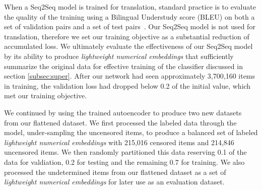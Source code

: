 When a Seq2Seq model is trained for translation, standard practice is to evaluate the quality of the training using a Bilingual Understudy score (BLEU) on both a set of validation pairs and a set of test pairs~\cite{papineni_bleu_2001}. Our Seq2Seq model is not used for translation, therefore we set our training objective as a substantial reduction of accumulated loss. We ultimately evaluate the effectiveness of our Seq2Seq model by its ability to produce \textit{lightweight numerical embeddings} that sufficiently summarize the original data for effective training of the classifier discussed in section \ref{subsec:super}. After our network had seen approximately 3,700,160 items in training, the validation loss had dropped below 0.2 of the initial value, which met our training objective.

We continued by using the trained autoencoder to produce two new datasets from our flattened dataset. We first processed the labeled data through the model, under-sampling the uncensored items, to produce a balanced set of labeled \textit{lightweight numerical embeddings} with 215,016 censored items and 214,846 uncensored items.  We then randomly partitioned this data reserving 0.1 of the data for valdiation, 0.2 for testing and the remaining 0.7 for training. We also processed the undetermined items from our flattened dataset as a set of \textit{lightweight numerical embeddings} for later use as an evaluation dataset.

